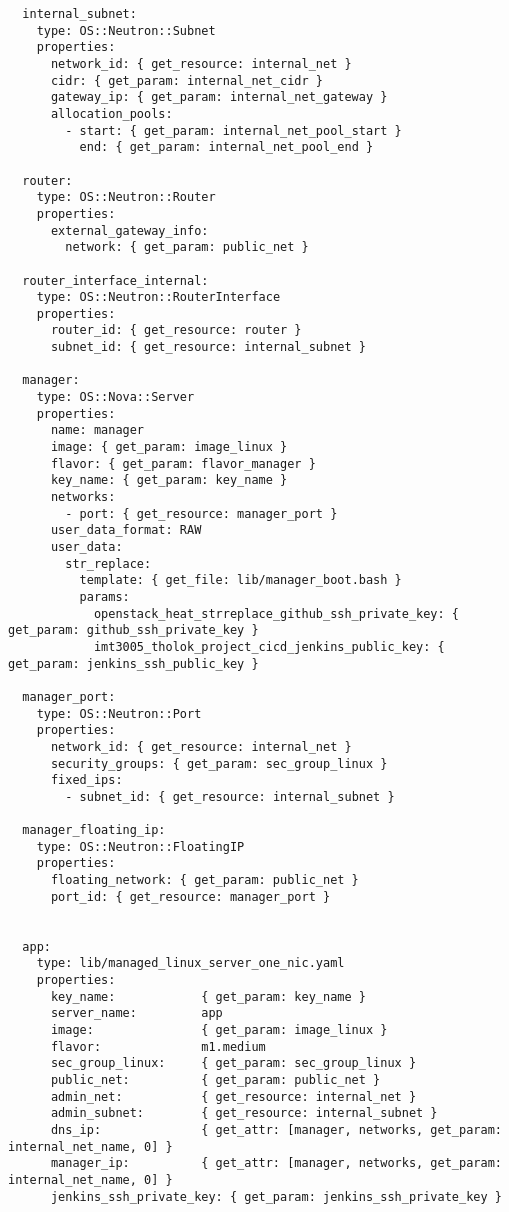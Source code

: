 \begin{verbatim}
  internal_subnet:
    type: OS::Neutron::Subnet
    properties:
      network_id: { get_resource: internal_net }
      cidr: { get_param: internal_net_cidr }
      gateway_ip: { get_param: internal_net_gateway }
      allocation_pools:
        - start: { get_param: internal_net_pool_start }
          end: { get_param: internal_net_pool_end }

  router:
    type: OS::Neutron::Router
    properties:
      external_gateway_info:
        network: { get_param: public_net }

  router_interface_internal:
    type: OS::Neutron::RouterInterface
    properties:
      router_id: { get_resource: router }
      subnet_id: { get_resource: internal_subnet }

  manager:
    type: OS::Nova::Server
    properties:
      name: manager
      image: { get_param: image_linux }
      flavor: { get_param: flavor_manager }
      key_name: { get_param: key_name }
      networks:
        - port: { get_resource: manager_port }
      user_data_format: RAW
      user_data:
        str_replace:
          template: { get_file: lib/manager_boot.bash }
          params:
            openstack_heat_strreplace_github_ssh_private_key: { get_param: github_ssh_private_key }
            imt3005_tholok_project_cicd_jenkins_public_key: { get_param: jenkins_ssh_public_key }

  manager_port:
    type: OS::Neutron::Port
    properties:
      network_id: { get_resource: internal_net }
      security_groups: { get_param: sec_group_linux }
      fixed_ips:
        - subnet_id: { get_resource: internal_subnet }

  manager_floating_ip:
    type: OS::Neutron::FloatingIP
    properties:
      floating_network: { get_param: public_net }
      port_id: { get_resource: manager_port }


  app:
    type: lib/managed_linux_server_one_nic.yaml
    properties:
      key_name:            { get_param: key_name }
      server_name:         app
      image:               { get_param: image_linux }
      flavor:              m1.medium
      sec_group_linux:     { get_param: sec_group_linux }  
      public_net:          { get_param: public_net }  
      admin_net:           { get_resource: internal_net }
      admin_subnet:        { get_resource: internal_subnet }
      dns_ip:              { get_attr: [manager, networks, get_param: internal_net_name, 0] }
      manager_ip:          { get_attr: [manager, networks, get_param: internal_net_name, 0] }
      jenkins_ssh_private_key: { get_param: jenkins_ssh_private_key }


\end{verbatim}
